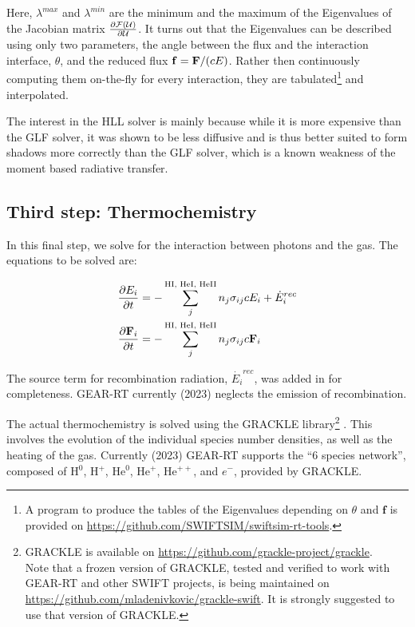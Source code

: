 Here, $\lambda^{max}$ and $\lambda^{min}$ are the minimum and the maximum of the Eigenvalues of the
Jacobian matrix $\frac{\partial \mathcal{F}(\mathcal{U})}{\partial \mathcal{U}}$. It turns out that the Eigenvalues can be described
using only two parameters, the angle between the flux and the interaction interface, $\theta$, and
the reduced flux $\mathbf{f} = \mathbf{F} / (cE)$. Rather then continuously computing them on-the-fly for
every interaction, they are tabulated\footnote{
A program to produce the tables of the Eigenvalues depending on $\theta$ and $\mathbf{f}$ is
provided on \url{https://github.com/SWIFTSIM/swiftsim-rt-tools}.
}
and interpolated.

The interest in the HLL solver is mainly because while it is more expensive than the GLF solver, it
was shown \citep{ramses-rt13, gonzalezHERACLESThreedimensionalRadiation2007} to be less diffusive
and is thus better suited to form shadows more correctly than the GLF solver, which is a known
weakness of the moment based radiative transfer.











\subsection{Third step: Thermochemistry}


In this final step, we solve for the interaction between photons and the gas. The equations to be
solved are:

\begin{align*}
	\frac{\partial E_i}{\partial t}  &=
		- \sum\limits_{j}^{\text{HI, HeI, HeII}} n_j \sigma_{i j} c E_i + \dot E_i ^{rec}
\\
	\frac{\partial \mathbf{F}_i}{\partial t} &=
		- \sum\limits_{j}^{\text{HI, HeI, HeII}} n_j \sigma_{i j} c \mathbf{F}_i
\end{align*}

The source term for recombination radiation, $\dot{E_i}^{rec}$, was added in for completeness.
GEAR-RT currently (2023) neglects the emission of recombination.

The actual thermochemistry is solved using the GRACKLE library\footnote{
GRACKLE is available on \url{https://github.com/grackle-project/grackle}.\\
Note that a frozen version of GRACKLE, tested and verified to work with GEAR-RT and other SWIFT
projects, is being maintained on \url{https://github.com/mladenivkovic/grackle-swift}. It is
strongly suggested to use that version of GRACKLE.
}
\citep{smithGrackleChemistryCooling2017}. This involves the evolution of the individual species
number densities, as well as the heating of the gas. Currently (2023) GEAR-RT supports the ``6
species network'', composed of H$^0$, H$^+$, He$^0$, He$^+$, He$^{++}$, and $e^{-}$, provided by
GRACKLE.

